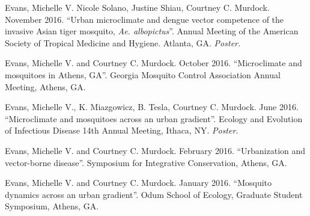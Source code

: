 \begin{cvitems}
	\item Evans, Michelle V. Nicole Solano, Justine Shiau, Courtney C. Murdock. November 2016. ``Urban microclimate and dengue vector competence of the invasive Asian tiger mosquito, \textit{Ae. albopictus}''. Annual Meeting of the American Society of Tropical Medicine and Hygiene. Atlanta, GA. \textit{Poster.}

	\item Evans, Michelle V. and Courtney C. Murdock. October 2016. ``Microclimate and mosquitoes in Athens, GA''. Georgia Mosquito Control Association Annual Meeting, Athens, GA.

	\item Evans, Michelle V., K. Miazgowicz, B. Tesla, Courtney C. Murdock. June 2016. ``Microclimate and mosquitoes across an urban gradient''. Ecology and Evolution of Infectious Disease 14th Annual Meeting, Ithaca, NY. \textit{Poster.}

	\item Evans, Michelle V. and Courtney C. Murdock. February 2016. ``Urbanization and vector-borne disease''. Symposium for Integrative Conservation, Athens, GA.

	\item Evans, Michelle V. and Courtney C. Murdock. January 2016. ``Mosquito dynamics across an urban gradient''. Odum School of Ecology, Graduate Student Symposium, Athens, GA.

	\bigskip
\end{cvitems}
